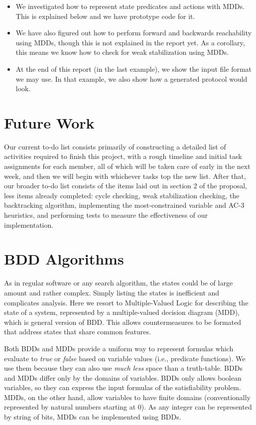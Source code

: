 \begin{itemize}
 \item We investigated how to represent state predicates and actions with MDDs.
  This is explained below and we have prototype code for it.
 \item We have also figured out how to perform forward and backwards reachability using MDDs, though this is not explained in the report yet.
  As a corollary, this means we know how to check for weak stabilization using MDDs.
 \item At the end of this report (in the last example), we show the input file format we may use.
  In that example, we also show how a generated protocol would look.
\end{itemize}

\section{Future Work}

Our current to-do list consists primarily of constructing a detailed list of activities required to finish this project, with a rough timeline 
and initial task assignments for each member, all of which will be taken care of early in the next week, and then we will begin with whichever tasks top
the new list.  After that, our broader to-do list consists of the items laid out in section 2 of the proposal, less items already completed:
cycle checking, weak stabilization checking, the backtracking algorithm, implementing the most-constrained variable and AC-3 heuristics, and performing
tests to measure the effectiveness of our implementation.

\section{BDD Algorithms}
As in regular software or any search algorithm, the states could be of large amount and rather complex. Simply listing the states is inefficient and complicates analysis. Here we resort to Multiple-Valued Logic for describing the state of a system, represented by a multiple-valued decision diagram (MDD), which is general version of BDD. This allows countermeasures to be formated that address states that share common features. 

Both BDDs and MDDs provide a uniform way to represent formulas which evaluate to {\it true} or {\it false} based on variable values (i.e., predicate functions).
We use them because they can also use {\em much less} space than a truth-table.
BDDs and MDDs differ only by the domains of variables. BDDs only allows boolean variables, so they can express the input formulas of the satisfiability problem.
MDDs, on the other hand, allow variables to have finite domains (conventionally represented by natural numbers starting at $0$).
As any integer can be represented by string of bits, MDDs can be implemented using BDDs.

